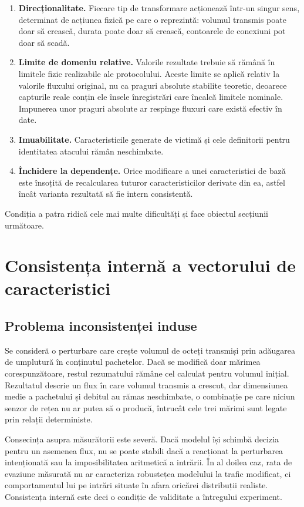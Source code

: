 \begin{enumerate}
    \item \textbf{Direcționalitate.} Fiecare tip de transformare acționează într-un singur sens, determinat de acțiunea fizică pe care o reprezintă: volumul transmis poate doar să crească, durata poate doar să crească, contoarele de conexiuni pot doar să scadă.
    \item \textbf{Limite de domeniu relative.} Valorile rezultate trebuie să rămână în limitele fizic realizabile ale protocolului. Aceste limite se aplică relativ la valorile fluxului original, nu ca praguri absolute stabilite teoretic, deoarece capturile reale conțin ele însele înregistrări care încalcă limitele nominale. Impunerea unor praguri absolute ar respinge fluxuri care există efectiv în date.
    \item \textbf{Imuabilitate.} Caracteristicile generate de victimă și cele definitorii pentru identitatea atacului rămân neschimbate.
    \item \textbf{Închidere la dependențe.} Orice modificare a unei caracteristici de bază este însoțită de recalcularea tuturor caracteristicilor derivate din ea, astfel încât varianta rezultată să fie intern consistentă.
\end{enumerate}

Condiția a patra ridică cele mai multe dificultăți și face obiectul secțiunii următoare.

\section{Consistența internă a vectorului de caracteristici}\label{sec:consistenta}

\subsection{Problema inconsistenței induse}\label{subsec:inconsistenta}

Se consideră o perturbare care crește volumul de octeți transmiși prin adăugarea de umplutură în conținutul pachetelor. Dacă se modifică doar mărimea corespunzătoare, restul rezumatului rămâne cel calculat pentru volumul inițial. Rezultatul descrie un flux în care volumul transmis a crescut, dar dimensiunea medie a pachetului și debitul au rămas neschimbate, o combinație pe care niciun senzor de rețea nu ar putea să o producă, întrucât cele trei mărimi sunt legate prin relații deterministe.

Consecința asupra măsurătorii este severă. Dacă modelul își schimbă decizia pentru un asemenea flux, nu se poate stabili dacă a reacționat la perturbarea intenționată sau la imposibilitatea aritmetică a intrării. În al doilea caz, rata de evaziune măsurată nu ar caracteriza robustețea modelului la trafic modificat, ci comportamentul lui pe intrări situate în afara oricărei distribuții realiste. Consistența internă este deci o condiție de validitate a întregului experiment.

